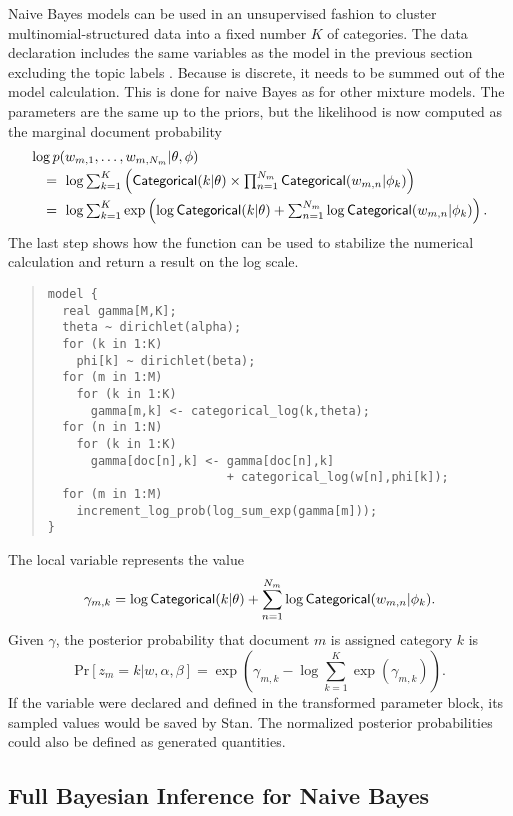 Naive Bayes models can be used in an unsupervised fashion to cluster
multinomial-structured data into a fixed number $K$ of categories.  
The data declaration includes the same variables as the model in the
previous section excluding the topic labels .   Because
 is discrete, it needs to be summed out of the model
calculation.  This is done for naive Bayes as for other mixture
models.  The parameters are the same up to the priors, but the
likelihood is now computed as the marginal document probability
\[
\begin{array}{l}
\log p(w_{m,1},\ldots,w_{m,N_m}|\theta,\phi)
\\[2pt]
\ \ \ = \ 
\log \sum_{k=1}^K 
\left( \distro{Categorical}(k|\theta)
        \times \prod_{n=1}^{N_m} \distro{Categorical}(w_{m,n}|\phi_k)
\right)
\\[6pt]
\ \ \ = \ 
\log \sum_{k=1}^K \exp \left(
\log \distro{Categorical}(k|\theta)
+ \sum_{n=1}^{N_m} \log \distro{Categorical}(w_{m,n}|\phi_k)
\right).
\end{array}
\]
%
The last step shows how the  function can be used
to stabilize the numerical calculation and return a result on the log
scale.
%
\begin{quote}
\begin{Verbatim}[fontsize=\small]
model {
  real gamma[M,K];
  theta ~ dirichlet(alpha);
  for (k in 1:K)
    phi[k] ~ dirichlet(beta);
  for (m in 1:M) 
    for (k in 1:K) 
      gamma[m,k] <- categorical_log(k,theta);
  for (n in 1:N)
    for (k in 1:K)
      gamma[doc[n],k] <- gamma[doc[n],k] 
                         + categorical_log(w[n],phi[k]);
  for (m in 1:M)
    increment_log_prob(log_sum_exp(gamma[m]));
}
\end{Verbatim}
\end{quote}
%
The local variable  represents the value
\[
\gamma_{m,k} = \log \mbox{\sf Categorical}(k|\theta)
+ \sum_{n=1}^{N_m} \log \mbox{\sf Categorical}(w_{m,n}|\phi_k).
\]
%
Given $\gamma$, the posterior probability that document
$m$ is assigned category $k$ is
\[
\mbox{Pr}[z_m = k|w,\alpha,\beta]
=
\exp \left( 
\gamma_{m,k}
- \log \sum_{k=1}^K \exp \left( \gamma_{m,k} \right)
\right).
\]
%
If the variable  were declared and defined in the
transformed parameter block, its sampled values would be saved by
Stan.  The normalized posterior probabilities could also be defined as
generated quantities.

\subsection{Full Bayesian Inference for Naive Bayes}

